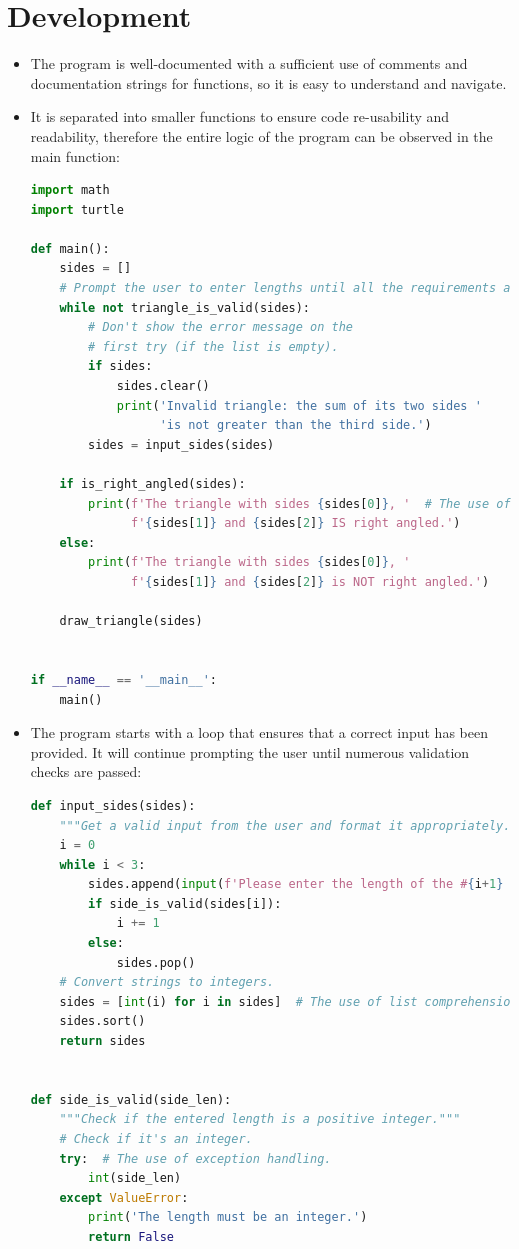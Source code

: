 \documentclass{article}
\begin{document}
\section{Development}
\begin{itemize}
    \item The program is well-documented with a sufficient use of comments and
        documentation strings for functions, so it is easy to understand and
        navigate.
    \item It is separated into smaller functions to ensure code re-usability
        and readability, therefore the entire logic of the program can be
        observed in the main function:
\begin{lstlisting}[language=Python]
import math
import turtle

def main():
    sides = []
    # Prompt the user to enter lengths until all the requirements are met.
    while not triangle_is_valid(sides):
        # Don't show the error message on the
        # first try (if the list is empty).
        if sides:
            sides.clear()
            print('Invalid triangle: the sum of its two sides '
                  'is not greater than the third side.')
        sides = input_sides(sides)

    if is_right_angled(sides):
        print(f'The triangle with sides {sides[0]}, '  # The use of f-strings.
              f'{sides[1]} and {sides[2]} IS right angled.')
    else:
        print(f'The triangle with sides {sides[0]}, '
              f'{sides[1]} and {sides[2]} is NOT right angled.')

    draw_triangle(sides)


if __name__ == '__main__':
    main()
\end{lstlisting}
\break
    \item The program starts with a loop that ensures that a correct input has
        been provided. It will continue prompting the user until numerous
        validation checks are passed:
\begin{lstlisting}[language=Python]
def input_sides(sides):
    """Get a valid input from the user and format it appropriately."""
    i = 0
    while i < 3:
        sides.append(input(f'Please enter the length of the #{i+1} side: '))
        if side_is_valid(sides[i]):
            i += 1
        else:
            sides.pop()
    # Convert strings to integers.
    sides = [int(i) for i in sides]  # The use of list comprehension.
    sides.sort()
    return sides


def side_is_valid(side_len):
    """Check if the entered length is a positive integer."""
    # Check if it's an integer.
    try:  # The use of exception handling.
        int(side_len)
    except ValueError:
        print('The length must be an integer.')
        return False


\end{lstlisting}
\end{itemize}
\end{document}
